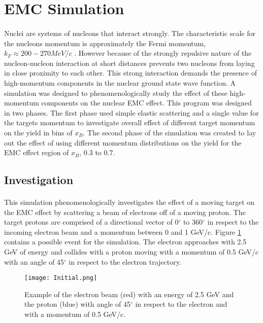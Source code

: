 \renewcommand{\textfraction}{0.45}
\section{EMC Simulation}\label{A:EMCsim}

\paragraph{}Nuclei are systems of nucleons that interact strongly. The characteristic scale for the nucleons momentum is approximately the Fermi momentum, $k_F \approx 200-270 MeV/c$ \cite{gomez}. However because of the strongly repulsive nature of the nucleon-nucleon interaction at short distances prevents two nucleons from laying in close proximity to each other. This strong interaction demands the presence of high-momentum components in the nuclear ground state wave function. A simulation was designed to phenomenologically study the effect of these high-momentum components on the nuclear EMC effect. This program was designed in two phases. The first phase used simple elastic scattering and a single value for the targets momentum to investigate overall effect of different target momentum on the yield in bins of $x_B$. The second phase of the simulation was created to lay out the effect of using different momentum distributions on the yield for the EMC effect region of $x_B$, 0.3 to 0.7.
\subsection{Investigation} \paragraph{}This simulation phenomenologically investigates the effect of a moving target on the EMC effect by scattering a beam of electrons off of a moving proton. The target protons are comprised of a directional vector of 0$^\circ$ to 360$^\circ$ in respect to the incoming electron beam and a momentum between 0 and 1 GeV/c. Figure \ref{example} contains a possible event for the simulation. The electron approaches with 2.5 GeV of energy and collides with a proton moving with a momentum of 0.5 GeV/c with an angle of 45$^\circ$ in respect to the electron trajectory. 
\begin{figure}[t]
\centering
\texttt{[image: Initial.png]}
\caption{Example of the electron beam (red) with an energy of 2.5 GeV and the proton (blue) with angle of 45$^\circ$ in respect to the electron and with a momentum of 0.5 GeV/c.}
\label{example}
\end{figure}
